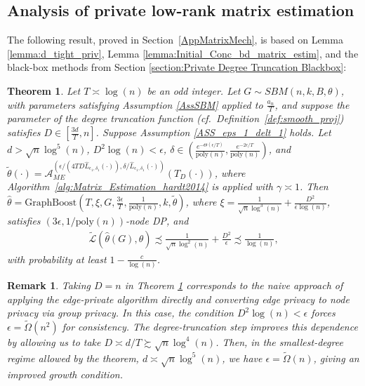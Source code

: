 \documentclass{article}
\newtheorem{remark}{Remark}
\newtheorem{theorem}{Theorem}
\newcommand{\thetahat}{\ensuremath{\widehat{\theta}}}
\begin{document}

\subsection{Analysis of private low-rank matrix estimation}
\label{SecLR}

The following result, proved in Section~\ref{AppMatrixMech}, is based on Lemma \ref{lemma:d_tight_priv}, Lemma \ref{lemma:Initial_Conc_bd_matrix_estim}, and the black-box methods from Section \ref{section:Private Degree Truncation Blackbox}:

\begin{theorem}
\label{theorem:Matrix_Mech_Main_Thm}
Let $T \asymp \log(n)$ be an odd integer. Let $G \sim SBM(n, k, B, \theta)$, with parameters satisfying Assumption \ref{AssSBM} applied to $\frac{a_n}{T}$, and suppose the parameter of the degree truncation function (cf.\ Definition~\ref{def:smooth_proj}) satisfies $D \in \left[\frac{3d}{T}, n\right]$. Suppose Assumption \ref{ASS_eps_1_delt_1} holds. Let $d > \sqrt{n}\log^5(n)$, $D^2\log(n) < \epsilon$, $\delta \in \left(\frac{e^{-\Theta(\epsilon/T)}}{\mathrm{poly}(n)}, \frac{e^{-2\epsilon/T}}{\mathrm{poly}(n)}\right)$, and $\widetilde{\theta}(\cdot) = \mathcal{A}_{ME}^{\left(\epsilon/(4TD\hat{L}_{\epsilon_1, \delta_1}(\cdot)), \delta/\hat{L}_{\epsilon_1, \delta_1}(\cdot)\right)}(T_{D}(\cdot))$, where Algorithm~\ref{alg:Matrix_Estimation_hardt2014} is applied with $\gamma \asymp 1$. Then $\thetahat = \mathrm{GraphBoost}\left(T, \xi, G, \frac{3\epsilon}{T}, \frac{1}{\mathrm{poly}(n)}, k, \widetilde{\theta}\right)$, where $\xi = \frac{1}{\sqrt{n}\log^3(n)} + \frac{D^2}{\epsilon\log(n)}$, satisfies $(3\epsilon, 1/\mathrm{poly}(n))$-node DP, and
\begin{align*}
\widetilde{\mathcal{L}}\left(\thetahat(G), \theta\right) \precsim \frac{1}{\sqrt{n}\log^2(n)} + \frac{D^2}{\epsilon} \precsim \frac{1}{\log(n)},
\end{align*}
with probability at least $1 - \frac{c}{\log(n)}$.
\end{theorem}

\begin{remark}
\label{remark:ME_D=n}
Taking $D = n$ in Theorem \ref{theorem:Matrix_Mech_Main_Thm} corresponds to the naive approach of applying the edge-private algorithm directly and converting edge privacy to node privacy via group privacy. In this case, the condition
$D^2\log(n)<\epsilon$ forces $\epsilon = \widetilde{\Omega}(n^2)$ for consistency. The degree-truncation step improves this dependence by allowing us to take $D \asymp d/T \succsim \sqrt{n}\log^4(n)$. Then, in the smallest-degree regime allowed by the theorem, $d \asymp \sqrt{n}\log^5(n)$, we have $\epsilon = \widetilde{\Omega}(n)$, giving an improved growth condition.
\end{remark}
\end{document}
